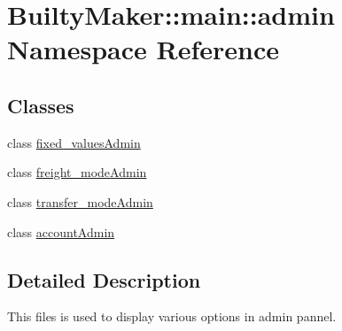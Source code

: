 \hypertarget{namespaceBuiltyMaker_1_1main_1_1admin}{\section{\-Builty\-Maker\-:\-:main\-:\-:admin \-Namespace \-Reference}
\label{namespaceBuiltyMaker_1_1main_1_1admin}
}
\subsection*{\-Classes}
\begin{DoxyCompactItemize}
\item 
class \hyperlink{classBuiltyMaker_1_1main_1_1admin_1_1fixed__valuesAdmin}{fixed\-\_\-values\-Admin}
\item 
class \hyperlink{classBuiltyMaker_1_1main_1_1admin_1_1freight__modeAdmin}{freight\-\_\-mode\-Admin}
\item 
class \hyperlink{classBuiltyMaker_1_1main_1_1admin_1_1transfer__modeAdmin}{transfer\-\_\-mode\-Admin}
\item 
class \hyperlink{classBuiltyMaker_1_1main_1_1admin_1_1accountAdmin}{account\-Admin}
\end{DoxyCompactItemize}


\subsection{\-Detailed \-Description}
\begin{DoxyVerb}
    This files is used to display various options in admin pannel.
\end{DoxyVerb}
 